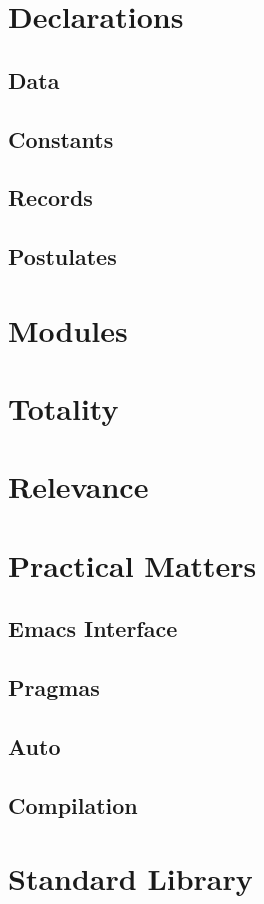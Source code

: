 \documentclass{article}
\begin{document}
\section{Declarations}
\subsection{Data}
\subsection{Constants}
\subsection{Records}
\subsection{Postulates}
\section{Modules}
\label{sec:modules}
\section{Totality}
\section{Relevance}
\section{Practical Matters}
\subsection{Emacs Interface}
\subsection{Pragmas}
\subsection{Auto}
\subsection{Compilation}
\section{Standard Library}
\end{document}
